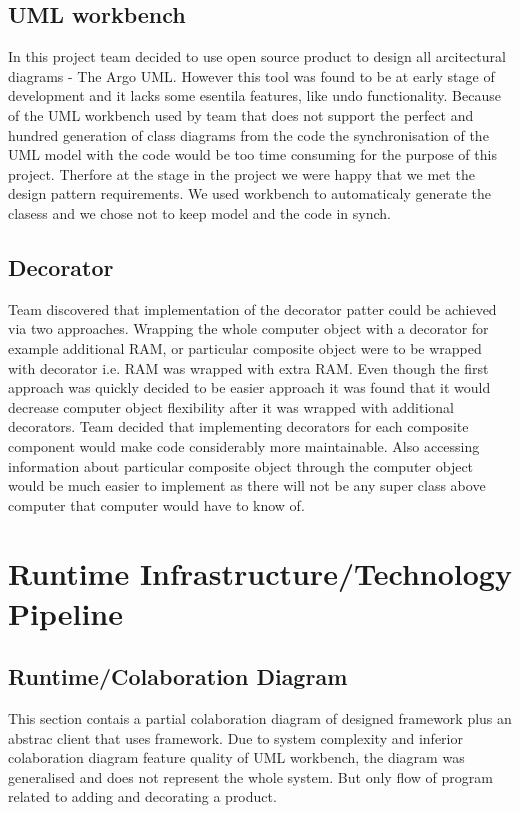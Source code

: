 \documentclass[pdftex,11pt,a4paper]{article}
\begin{document}
\subsection{UML workbench}
In this project team decided to use open source product to design all arcitectural diagrams - The Argo UML. However this tool was found to be at early stage of development and it lacks some esentila features, like undo functionality. Because of the UML workbench used by team that does not support the perfect and hundred  generation of class diagrams from the code the synchronisation of the UML model with the code would be too time consuming for the purpose of this project. Therfore at the stage in the project we were happy that we met the design pattern requirements. We used workbench to automaticaly generate the clasess and we chose not to keep model and the code in synch.

\subsection{Decorator}

Team discovered that implementation of the decorator patter could be achieved via two approaches. Wrapping the whole computer object with a decorator for example additional RAM, or particular composite object were to be wrapped with decorator i.e. RAM was wrapped with extra RAM. Even though the first approach was quickly decided to be easier approach it was found that it would decrease computer object flexibility after it was wrapped with additional decorators. Team decided that implementing decorators for each composite component would make code considerably more maintainable. Also accessing information about particular composite object through the computer object would be much easier to implement as there will not be any super class above computer that computer would have to know of.

\pagebreak

\section{Runtime Infrastructure/Technology Pipeline}
\subsection{Runtime/Colaboration Diagram}
This section contais a partial colaboration diagram of designed framework plus an abstrac client that uses framework. Due to system complexity and inferior colaboration diagram feature quality of UML workbench, the diagram was generalised and does not represent the whole system. But only flow of program related to adding and decorating a product.
\end{document}
